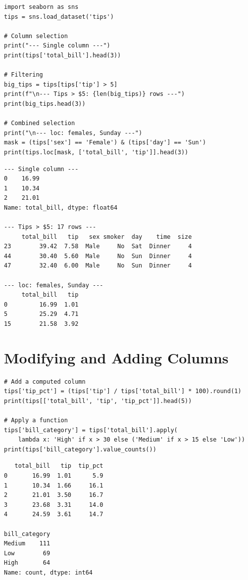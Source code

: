 \begin{codeblock}[title=\textbf{Python --- Selection}]
\begin{verbatim}
import seaborn as sns
tips = sns.load_dataset('tips')

# Column selection
print("--- Single column ---")
print(tips['total_bill'].head(3))

# Filtering
big_tips = tips[tips['tip'] > 5]
print(f"\n--- Tips > $5: {len(big_tips)} rows ---")
print(big_tips.head(3))

# Combined selection
print("\n--- loc: females, Sunday ---")
mask = (tips['sex'] == 'Female') & (tips['day'] == 'Sun')
print(tips.loc[mask, ['total_bill', 'tip']].head(3))
\end{verbatim}
\end{codeblock}

\begin{codeoutput}
\begin{verbatim}
--- Single column ---
0    16.99
1    10.34
2    21.01
Name: total_bill, dtype: float64

--- Tips > $5: 17 rows ---
     total_bill   tip   sex smoker  day    time  size
23        39.42  7.58  Male     No  Sat  Dinner     4
44        30.40  5.60  Male     No  Sun  Dinner     4
47        32.40  6.00  Male     No  Sun  Dinner     4

--- loc: females, Sunday ---
     total_bill   tip
0         16.99  1.01
5         25.29  4.71
15        21.58  3.92
\end{verbatim}
\end{codeoutput}

\section{Modifying and Adding Columns}

\begin{codeblock}[title=\textbf{Python --- New columns}]
\begin{verbatim}
# Add a computed column
tips['tip_pct'] = (tips['tip'] / tips['total_bill'] * 100).round(1)
print(tips[['total_bill', 'tip', 'tip_pct']].head(5))

# Apply a function
tips['bill_category'] = tips['total_bill'].apply(
    lambda x: 'High' if x > 30 else ('Medium' if x > 15 else 'Low'))
print(tips['bill_category'].value_counts())
\end{verbatim}
\end{codeblock}

\begin{codeoutput}
\begin{verbatim}
   total_bill   tip  tip_pct
0       16.99  1.01      5.9
1       10.34  1.66     16.1
2       21.01  3.50     16.7
3       23.68  3.31     14.0
4       24.59  3.61     14.7

bill_category
Medium    111
Low        69
High       64
Name: count, dtype: int64
\end{verbatim}
\end{codeoutput}

